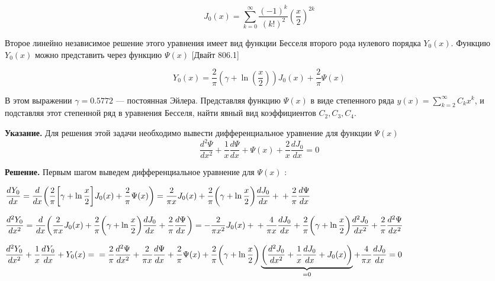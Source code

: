 \documentclass[a4paper, 12pt]{article}
\begin{document}
	\begin{equation}
		J_0(x) = \sum_{k=0}^{\infty} \frac{(-1)^k}{(k!)^2} \left( \frac{x}{2} \right)^{2k}
	\end{equation}
	
	Второе линейно независимое решение этого уравнения имеет вид функции Бесселя второго рода нулевого порядка \( Y_0(x) \). Функцию \( Y_0(x) \) можно представить через функцию \( \Psi(x) \) [Двайт 806.1]
	
	\begin{equation}
		Y_0(x) = \frac{2}{\pi} \left( \gamma + \ln \left( \frac{x}{2} \right) \right) J_0(x) + \frac{2}{\pi} \Psi(x)
	\end{equation}
	
	В этом выражении \( \gamma = 0.5772 \) — постоянная Эйлера. Представляя функцию \( \Psi(x) \) в виде степенного ряда \( y(x) = \displaystyle\sum\limits_{k=2}^{\infty} C_k x^k \), и подставляя этот степенной ряд в уравнения Бесселя, найти явный вид коэффициентов \( C_2, C_3, C_4 \).
	
	\textbf{Указание.} Для решения этой задачи необходимо вывести дифференциальное уравнение для функции \( \Psi(x) \)
	\begin{equation}
		\dfrac{d^2 \Psi}{dx^2} + \frac{1}{x} \dfrac{d\Psi }{dx} + \Psi (x)+ \dfrac{2}{x}\dfrac{dJ_0}{dx} = 0
	\end{equation}
	
	\quad \textbf{Решение. } Первым шагом выведем дифференциальное уравнение для $\Psi(x)$ :
	
	$\dfrac{dY_0}{dx} = \dfrac{d}{dx} \bigg(\dfrac{2}{\pi} \bigg[ \gamma + \ln{\dfrac{x}{2}}\bigg]J_0 (x) + \dfrac{2}{\pi} \Psi(x)\bigg) = \dfrac{2}{\pi x} J_0 (x) + \dfrac{2}{\pi} \bigg(\gamma + \ln{\dfrac{x}{2}}\bigg) \dfrac{dJ_0}{dx} + \newline + \dfrac{2}{\pi} \dfrac{d\Psi}{dx}$
	
	$\dfrac{d^2 Y_0}{dx^2} = \dfrac{d}{dx} \bigg( \dfrac{2}{\pi x} J_0 (x) + \dfrac{2}{\pi} \bigg(\gamma + \ln{\dfrac{x}{2}}\bigg) \dfrac{dJ_0}{dx} + \dfrac{2}{\pi} \dfrac{d\Psi}{dx} \bigg) = -\dfrac{2}{\pi x^2} J_0 (x) + \newline + \dfrac{4}{\pi x} \dfrac{dJ_0}{dx} + \dfrac{2}{\pi} \bigg(\gamma + \ln{\dfrac{x}{2}}\bigg) \dfrac{d^2 J_0}{dx^2} + \dfrac{2}{\pi}\dfrac{d^2 \Psi}{dx^2} $
	
	\begin{center}
		$\dfrac{d^2 Y_0}{dx^2 } + \dfrac{1}{x} \dfrac{dY_0}{dx} + Y_0 (x) = \newline = \dfrac{2}{\pi} \dfrac{d^2 \Psi}{dx^2} + \dfrac{2}{\pi x} \dfrac{d\Psi}{dx} + \dfrac{2}{\pi} \Psi(x) + \dfrac{2}{\pi} \bigg(\gamma + \ln {\dfrac{x}{2}}\bigg)\underbrace{ \bigg(\dfrac{d^2 J_0 }{dx^2} + \dfrac{1}{x} \dfrac{dJ_0 }{dx} + J_0 (x) \bigg)}_{= 0} + \dfrac{4}{\pi x} \dfrac{dJ_0}{dx} = 0$
	\end{center}
	
\end{document}

